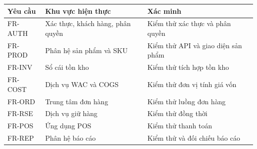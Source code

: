 \begin{center}
\begin{tabular}{|p{2.5cm}|p{4cm}|p{4cm}|}
\hline
Yêu cầu & Khu vực hiện thực & Xác minh \\
\hline
FR-AUTH & Xác thực, khách hàng, phân quyền & Kiểm thử xác thực và phân quyền \\
\hline
FR-PROD & Phân hệ sản phẩm và SKU & Kiểm thử API và giao diện sản phẩm \\
\hline
FR-INV & Sổ cái tồn kho & Kiểm thử tích hợp tồn kho \\
\hline
FR-COST & Dịch vụ WAC và COGS & Kiểm thử đơn vị tính giá vốn \\
\hline
FR-ORD & Trung tâm đơn hàng & Kiểm thử luồng đơn hàng \\
\hline
FR-RSE & Dịch vụ giữ hàng & Kiểm thử đồng thời \\
\hline
FR-POS & Ứng dụng POS & Kiểm thử thanh toán \\
\hline
FR-REP & Phân hệ báo cáo & Kiểm thử và đối chiếu báo cáo \\
\hline
\end{tabular}
\end{center}
